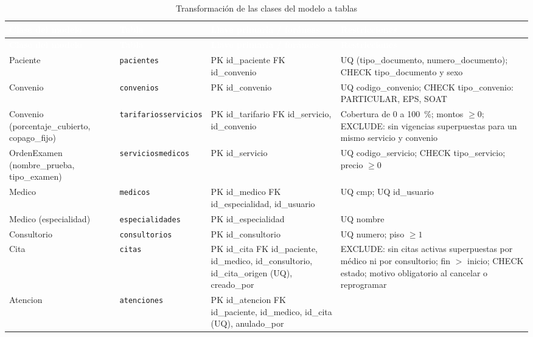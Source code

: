 \documentclass[11pt,a4paper]{article}
\newcommand{\cab}[1]{\textcolor{white}{\textbf{#1}}}
\newcommand{\tb}[1]{{\renewcommand{\_}{\textunderscore\allowbreak}\texttt{#1}}}
\begin{document}
\begingroup\small
\begin{xltabular}{\linewidth}{|P{3.1cm}|P{3.2cm}|P{4cm}|L|}
  \caption{Transformación de las clases del modelo a tablas}\label{tab:clases-tablas}\\
  \hline
  \cab{Clase del modelo} & \cab{Tabla} & \cab{Llave primaria / foráneas} & \cab{Restricciones} \\ \hline
  \endfirsthead
  \hline
  \cab{Clase del modelo} & \cab{Tabla} & \cab{Llave primaria / foráneas} & \cab{Restricciones} \\ \hline
  \endhead
  Paciente & \texttt{pacientes} &
    PK id\_paciente \newline FK id\_convenio &
    UQ (tipo\_documento, numero\_documento); CHECK tipo\_documento y sexo \\ \hline
  Convenio & \texttt{convenios} &
    PK id\_convenio &
    UQ codigo\_convenio; CHECK tipo\_convenio: PARTICULAR, EPS, SOAT \\ \hline
  Convenio (porcentaje\_cubierto, copago\_fijo) & \tb{tarifarios\_servicios} &
    PK id\_tarifario \newline FK id\_servicio, id\_convenio &
    Cobertura de 0 a 100~\%; montos $\geq 0$; EXCLUDE: sin vigencias superpuestas para un mismo servicio y convenio \\ \hline
  OrdenExamen (nombre\_prueba, tipo\_examen) & \tb{servicios\_medicos} &
    PK id\_servicio &
    UQ codigo\_servicio; CHECK tipo\_servicio; precio $\geq 0$ \\ \hline
  Medico & \texttt{medicos} &
    PK id\_medico \newline FK id\_especialidad, id\_usuario &
    UQ cmp; UQ id\_usuario \\ \hline
  Medico (especialidad) & \texttt{especialidades} &
    PK id\_especialidad &
    UQ nombre \\ \hline
  Consultorio & \texttt{consultorios} &
    PK id\_consultorio &
    UQ numero; piso $\geq 1$ \\ \hline
  Cita & \texttt{citas} &
    PK id\_cita \newline FK id\_paciente, id\_medico, id\_consultorio, id\_cita\_origen (UQ), creado\_por &
    EXCLUDE: sin citas activas superpuestas por médico ni por consultorio; fin $>$ inicio; CHECK estado; motivo obligatorio al cancelar o reprogramar \\ \hline
  Atencion & \texttt{atenciones} &
    PK id\_atencion \newline FK id\_paciente, id\_medico, id\_cita (UQ), anulado\_por &

\end{xltabular}
\end{document}
